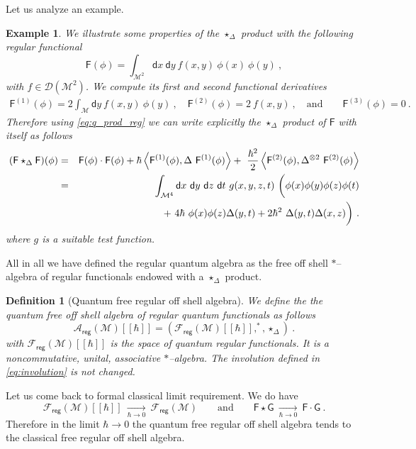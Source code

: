 \documentclass[11pt]{book}
\newcommand{\reg}{\mathsf{reg}}
\newcommand{\sm}[1]{\left\langle#1\right\rangle}
\newcommand{\Acal}{\mathcal{A}}
\newcommand{\Dcal}{\mathcal{D}}
\newcommand{\Fcal}{\mathcal{F}}
\newcommand{\Mcal}{\mathcal{M}}
\newcommand{\Fsf}{\mathsf{F}}
\newcommand{\Gsf}{\mathsf{G}}
\newcommand{\dsf}{\mathsf{d}}
\theoremstyle{break}
\newtheorem{example}{Example}[chapter]
\newtheorem{definition}{Definition}[chapter]
\begin{document}
Let us analyze an example.
%
\begin{example}
We illustrate some properties of the $\star_\Delta$ product with the following regular functional
%
\begin{equation*}
\Fsf(\phi) = \int_{\Mcal^2} \dsf x \ \dsf y \ f(x,y) \ \phi(x) \ \phi(y) \ ,
\end{equation*}
%
with $f \in \Dcal(\Mcal^2)$. We compute its first and second functional derivatives
%
\begin{eqnarray*}
\Fsf^{(1)}(\phi) = 2 \int_\Mcal \dsf y \ f(x,y) \ \phi(y) \ , 
\quad 
\Fsf^{(2)}(\phi) = 2 \ f(x,y) \ , 
\quad \mbox{and} \qquad 
\Fsf^{(3)}(\phi) = 0 \ .
\end{eqnarray*}
%
Therefore using \eqref{eq:q_prod_reg} we can write explicitly the $\star_\Delta$ product of $\Fsf$ with itself as follows
%
\begin{eqnarray*}
(\Fsf \star_\Delta \Fsf)(\phi) &=& \Fsf(\phi) \cdot \Fsf(\phi) + \hbar \sm{ \Fsf^{(1)}(\phi) , \Delta \ \Fsf^{(1)}(\phi) } + \ \frac{\hbar^2}{2} \sm{ \Fsf^{(2)}(\phi) , \Delta^{\otimes 2} \ \Fsf^{(2)}(\phi)} \\
%
&=& \int_{\Mcal^4} \dsf x \ \dsf y \ \dsf z \ \dsf t \ g(x,y,z,t) \ \bigg( \phi(x) \phi(y) \phi(z) \phi(t) \\
&& \hspace*{60pt} + \ 4 \hbar \ \phi(x) \phi(z) \Delta(y,t) + 2 \hbar^2 \ \Delta(y,t) \Delta(x,z) \bigg) \ .
\end{eqnarray*}
%
where $g$ is a suitable test function. 
\end{example}


All in all we have defined the regular quantum algebra as the free off shell $\ast$--algebra of regular functionals endowed with a $\star_\Delta$ product.


\begin{definition}[Quantum free regular off shell algebra]\label{def:alg_q_reg}
We define the the quantum free off shell algebra of regular quantum functionals as follows
%
\begin{equation*}
\Acal_\reg(\Mcal)[[\hbar]] = \left(\Fcal_\reg(\Mcal)[[\hbar]] , ^\ast , \star_{\Delta} \right) \ . 
\end{equation*}
%
with $\Fcal_\reg(\Mcal)[[\hbar]]$ is the space of quantum regular functionals. It is a noncommutative, unital, associative $\ast$--algebra. The involution defined in \eqref{eq:involution} is not changed.
\end{definition}


Let us come back to formal classical limit requirement. We do have
%
\begin{equation*}
\Fcal_\reg(\Mcal)[[\hbar]] \ \underset{\hbar \to 0}{\longrightarrow} \ \Fcal_\reg(\Mcal)\qquad \mbox{and} \qquad \Fsf \star \Gsf \ \underset{\hbar \to 0}{\longrightarrow} \ \Fsf \cdot \Gsf \ . 
\end{equation*}
%
Therefore in the limit $\hbar \to 0$ the quantum free regular off shell algebra tends to the classical free regular off shell algebra.
\end{document}
